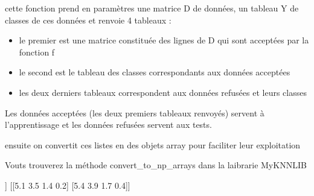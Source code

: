 \documentclass[letterpaper,10pt,english]{jupyterBook}
\begin{document}
\sphinxAtStartPar
cette fonction prend en paramètres une matrice D de données, un tableau Y de classes de ces données et renvoie 4 tableaux :
\begin{itemize}
\item {} 
\sphinxAtStartPar
le premier est une matrice constituée des lignes de D qui sont acceptées par la fonction f

\item {} 
\sphinxAtStartPar
le second est le tableau des classes correspondants aux données acceptées

\item {} 
\sphinxAtStartPar
les deux derniers tableaux correspondent aux données refusées et leurs classes

\end{itemize}

\sphinxAtStartPar
Les données acceptées (les deux premiers tableaux renvoyés) servent à l’apprentissage et les données refusées servent aux tests.

\sphinxAtStartPar
ensuite on convertit ces listes en des objets array pour faciliter leur exploitation
\begin{sphinxVerbatimInput}

\begin{sphinxVerbatim}[commandchars=\\\{\}]
  
\end{sphinxVerbatim}
\end{sphinxVerbatimInput}

\sphinxAtStartPar
Vouts trouverez la méthode convert\_to\_np\_arrays dans la laibrarie MyKNNLIB
\begin{sphinxVerbatimInput}

\begin{sphinxVerbatim}[commandchars=\\\{\}]
\PYG{p}{[}\PYG{p}{]}
\PYG{p}{[}\PYG{p}{]}
\end{sphinxVerbatim}
\end{sphinxVerbatimInput}
\begin{sphinxVerbatimOutput}

\begin{sphinxVerbatim}[commandchars=\\\{\}]
[[4.9 3.0 1.4 0.2]
 [4.7 3.2 1.3 0.2]]
[[5.1 3.5 1.4 0.2]
 [5.4 3.9 1.7 0.4]]
\end{sphinxVerbatim}
\end{sphinxVerbatimOutput}
\end{document}
